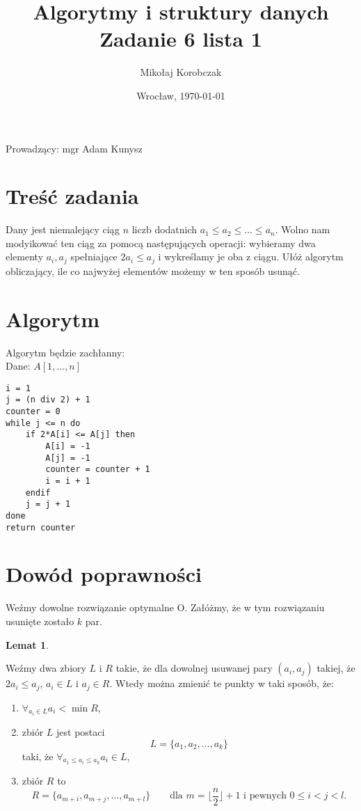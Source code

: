 \documentclass[11pt,wide]{mwart}
\date{Wrocław, \today}
\title{\LARGE\textbf{Algorytmy i struktury danych}\\Zadanie 6 lista 1}
\author{Mikołaj Korobczak}
\begin{document}
\maketitle
\begin{center}
Prowadzący: mgr Adam Kunysz
\end{center}
\thispagestyle{empty}

\section{Treść zadania}
Dany jest niemalejący ciąg $n$ liczb dodatnich $a_1 \leq a_2 \leq \dots \leq a_n$. Wolno nam modyikować ten ciąg za pomocą następujących operacji: wybieramy dwa elementy $a_i, a_j$ spełniające $2a_i \leq a_j$ i wykreślamy je oba z ciągu. Ułóż algorytm obliczający, ile co najwyżej elementów możemy w ten sposób usunąć.

\section{Algorytm}
\noindent Algorytm będzie zachłanny: \\
Dane: $A[1,\dots,n]$
\begin{verbatim}
i = 1
j = (n div 2) + 1
counter = 0
while j <= n do
    if 2*A[i] <= A[j] then
        A[i] = -1
        A[j] = -1 
        counter = counter + 1
        i = i + 1
    endif
    j = j + 1
done
return counter
\end{verbatim}

\section{Dowód poprawności}
Weźmy dowolne rozwiązanie optymalne O. Załóżmy, że w tym rozwiązaniu usunięte zostało $k$ par. 
\newtheorem{theorem}{Lemat}
\begin{theorem}
\end{theorem}
Weźmy dwa zbiory $L$ i $R$ takie, że dla dowolnej usuwanej pary $(a_i, a_j)$ takiej, że $2a_i \leq a_j$, $a_i \in L$ i $a_j \in R$. Wtedy można zmienić te punkty w taki sposób, że:
\begin{enumerate}
\item $\forall_{a_i \in L} a_i < \min R$,
\item zbiór $L$ jest postaci $$ L = \{a_1, a_2, \dots, a_k\} $$
taki, że $\forall_{a_1 \leq a_i \leq a_k} a_i \in L$,
\item zbiór $R$ to
$$ R = \{a_{m + i}, a_{m+j}, \dots, a_{m+l}\} \qquad \text{dla } m=\lfloor \frac{n}{2} \rfloor + 1 \text{ i pewnych } 0 \leq i < j < l \text{.}$$ 
\end{enumerate}
 
\end{document}
